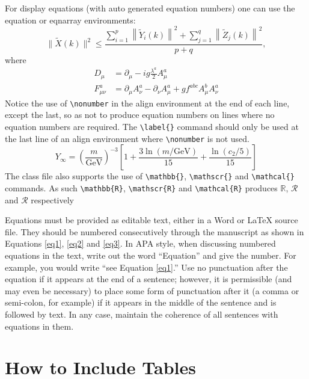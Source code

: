 \documentclass[12pt,a4paper]{article}
\begin{document}
For display equations (with auto generated equation numbers)
one can use the equation or eqnarray environments:
\begin{equation}
\|\tilde{X}(k)\|^2 \leq\frac{\sum\limits_{i=1}^{p}\left\|\tilde{Y}_i(k)\right\|^2+\sum\limits_{j=1}^{q}\left\|\tilde{Z}_j(k)\right\|^2 }{p+q},
\label{eq1}
\end{equation}
where
\begin{align}
D_\mu &=  \partial_\mu - ig \frac{\lambda^a}{2} A^a_\mu \nonumber \\
F^a_{\mu\nu} &= \partial_\mu A^a_\nu - \partial_\nu A^a_\mu + g f^{abc} A^b_\mu A^a_\nu
\label{eq2}
\end{align}
Notice the use of \verb+\nonumber+ in the align environment at the end
of each line, except the last, so as not to produce equation numbers on
lines where no equation numbers are required. The \verb+\label{}+ command
should only be used at the last line of an align environment where
\verb+\nonumber+ is not used.
\begin{equation}
Y_\infty = \left( \frac{m}{\textrm{GeV}} \right)^{-3}
    \left[ 1 + \frac{3 \ln(m/\textrm{GeV})}{15}
    + \frac{\ln(c_2/5)}{15} \right]
\label{eq3}
\end{equation}
The class file also supports the use of \verb+\mathbb{}+, \verb+\mathscr{}+ and
\verb+\mathcal{}+ commands. As such \verb+\mathbb{R}+, \verb+\mathscr{R}+
and \verb+\mathcal{R}+ produces $\mathbb{R}$, $\mathscr{R}$ and $\mathcal{R}$
respectively 

Equations must be provided as editable text, either in a Word or LaTeX source file. They should be numbered consecutively through the manuscript as shown in Equations \ref{eq1}, \ref{eq2} and \ref{eq3}. In APA style, when discussing numbered equations in the text, write out the word “Equation” and give the number. For example, you would write “see Equation \ref{eq1}.”
Use no punctuation after the equation if it appears at the end of a sentence; however, it is permissible (and may even be necessary) to place some form of punctuation after it (a comma or semi-colon, for example) if it appears in the middle of the sentence and is followed by text. In any case, maintain the coherence of all sentences with equations in them.


\section{How to Include Tables}\label{sec5}
\end{document}
